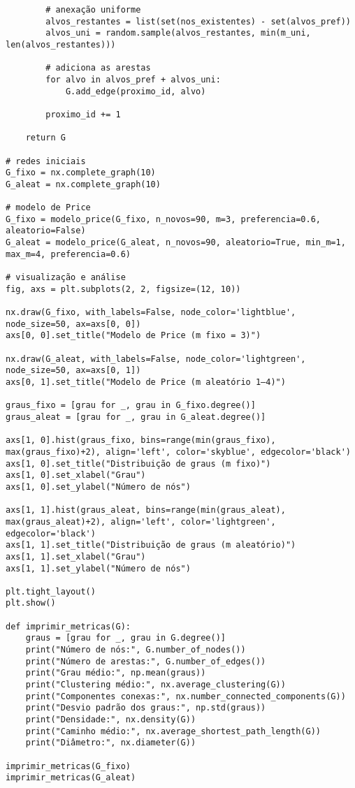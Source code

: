 \documentclass[a4paper]{article}
\begin{document}
\begin{verbatim}
        # anexação uniforme
        alvos_restantes = list(set(nos_existentes) - set(alvos_pref))
        alvos_uni = random.sample(alvos_restantes, min(m_uni, len(alvos_restantes)))

        # adiciona as arestas
        for alvo in alvos_pref + alvos_uni:
            G.add_edge(proximo_id, alvo)

        proximo_id += 1

    return G

# redes iniciais
G_fixo = nx.complete_graph(10)
G_aleat = nx.complete_graph(10)

# modelo de Price
G_fixo = modelo_price(G_fixo, n_novos=90, m=3, preferencia=0.6, aleatorio=False)
G_aleat = modelo_price(G_aleat, n_novos=90, aleatorio=True, min_m=1, max_m=4, preferencia=0.6)

# visualização e análise
fig, axs = plt.subplots(2, 2, figsize=(12, 10))

nx.draw(G_fixo, with_labels=False, node_color='lightblue', node_size=50, ax=axs[0, 0])
axs[0, 0].set_title("Modelo de Price (m fixo = 3)")

nx.draw(G_aleat, with_labels=False, node_color='lightgreen', node_size=50, ax=axs[0, 1])
axs[0, 1].set_title("Modelo de Price (m aleatório 1–4)")

graus_fixo = [grau for _, grau in G_fixo.degree()]
graus_aleat = [grau for _, grau in G_aleat.degree()]

axs[1, 0].hist(graus_fixo, bins=range(min(graus_fixo), max(graus_fixo)+2), align='left', color='skyblue', edgecolor='black')
axs[1, 0].set_title("Distribuição de graus (m fixo)")
axs[1, 0].set_xlabel("Grau")
axs[1, 0].set_ylabel("Número de nós")

axs[1, 1].hist(graus_aleat, bins=range(min(graus_aleat), max(graus_aleat)+2), align='left', color='lightgreen', edgecolor='black')
axs[1, 1].set_title("Distribuição de graus (m aleatório)")
axs[1, 1].set_xlabel("Grau")
axs[1, 1].set_ylabel("Número de nós")

plt.tight_layout()
plt.show()

def imprimir_metricas(G):
    graus = [grau for _, grau in G.degree()]
    print("Número de nós:", G.number_of_nodes())
    print("Número de arestas:", G.number_of_edges())
    print("Grau médio:", np.mean(graus))
    print("Clustering médio:", nx.average_clustering(G))
    print("Componentes conexas:", nx.number_connected_components(G))
    print("Desvio padrão dos graus:", np.std(graus))
    print("Densidade:", nx.density(G))
    print("Caminho médio:", nx.average_shortest_path_length(G))
    print("Diâmetro:", nx.diameter(G))

imprimir_metricas(G_fixo)
imprimir_metricas(G_aleat)

\end{verbatim}
\end{document}

